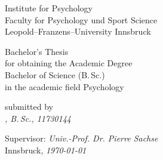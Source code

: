 \begin{titlepage}
   \begin{center}
        Institute for Psychology\\
        Faculty for Psychology und Sport Science\\
        Leopold--Franzens--University Innsbruck
 
        \vspace{4cm}
        \textit{\textbf{\Large {\@title}}}
 
        \vspace{2cm}
        Bachelor's Thesis\\
        for obtaining the Academic Degree\\
        Bachelor of Science (B.\,Sc.)\\
        in the academic field Psychology
 
        \vspace{3cm}
        submitted by\\
        \textit{\@author, B.\,Sc., 11730144}
 
        \vfill
 
        Supervisor: \textit{Univ.-Prof. Dr. Pierre Sachse}\\
        Innsbruck, \textit{\today}
   \end{center}
\end{titlepage}